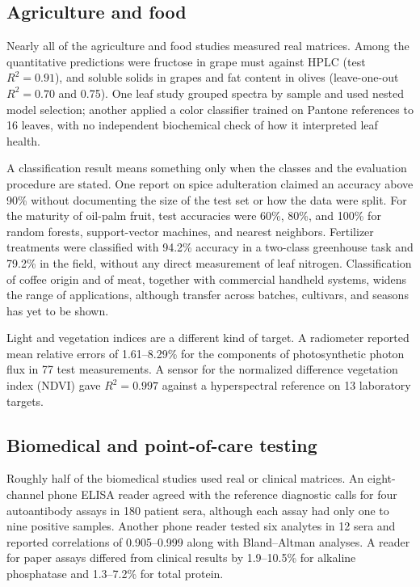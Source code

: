 \subsection{Agriculture and food}

Nearly all of the agriculture and food studies measured real matrices. Among the quantitative predictions were fructose in grape must against HPLC (test $R^2=0.91$),\citep{krause2021smartspectrometer} and soluble solids in grapes and fat content in olives (leave-one-out $R^2=0.70$ and 0.75).\citep{noguera2022new,aquino2022preliminary} One leaf study grouped spectra by sample and used nested model selection;\citep{lopin2025evaluation} another applied a color classifier trained on Pantone references to 16 leaves, with no independent biochemical check of how it interpreted leaf health.\citep{leccisi2025low}

A classification result means something only when the classes and the evaluation procedure are stated. One report on spice adulteration claimed an accuracy above 90\% without documenting the size of the test set or how the data were split.\citep{gund2026development} For the maturity of oil-palm fruit, test accuracies were 60\%, 80\%, and 100\% for random forests, support-vector machines, and nearest neighbors.\citep{suci2025determination} Fertilizer treatments were classified with 94.2\% accuracy in a two-class greenhouse task and 79.2\% in the field, without any direct measurement of leaf nitrogen.\citep{habibullah2020low} Classification of coffee origin and of meat,\citep{sagita2025rapid,wrdana2025classification} together with commercial handheld systems,\citep{mullermaatsch2021handheld,bec2022miniaturized} widens the range of applications, although transfer across batches, cultivars, and seasons has yet to be shown.

Light and vegetation indices are a different kind of target. A radiometer reported mean relative errors of 1.61--8.29\% for the components of photosynthetic photon flux in 77 test measurements.\citep{dolgalev2025development} A sensor for the normalized difference vegetation index (NDVI) gave $R^2=0.997$ against a hyperspectral reference on 13 laboratory targets.\citep{kitic2019new}

\subsection{Biomedical and point-of-care testing}

Roughly half of the biomedical studies used real or clinical matrices. An eight-channel phone ELISA reader agreed with the reference diagnostic calls for four autoantibody assays in 180 patient sera, although each assay had only one to nine positive samples.\citep{wang2018ultra} Another phone reader tested six analytes in 12 sera and reported correlations of 0.905--0.999 along with Bland--Altman analyses.\citep{luo2021smartphone} A reader for paper assays differed from clinical results by 1.9--10.5\% for alkaline phosphatase and 1.3--7.2\% for total protein.\citep{arunraj2024design}

